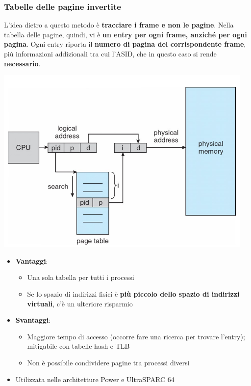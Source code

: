 \documentclass[12pt]{article}
\begin{document}
\subsubsection{Tabelle delle pagine invertite}
L'idea dietro a questo metodo è \textbf{tracciare i frame e non le pagine}. Nella tabella delle pagine, quindi, vi è \textbf{un entry per ogni frame, anziché per ogni pagina}.
Ogni entry riporta il \textbf{numero di pagina del corrispondente frame}, più informazioni addizionali tra cui l'ASID, che in questo caso si rende \textbf{necessario}.
\begin{center}
    \includegraphics[width = 0.70\linewidth]{Images/65.png}
\end{center}
\begin{itemize}
    \item \textbf{Vantaggi}:
    \begin{itemize}
        \item Una sola tabella per tutti i processi
        \item Se lo spazio di indirizzi fisici è \textbf{più piccolo dello spazio di indirizzi virtuali}, c'è un ulteriore risparmio
    \end{itemize}
    \item \textbf{Svantaggi}:
    \begin{itemize}
        \item Maggiore tempo di accesso (occorre fare una ricerca per trovare l'entry); mitigabile con tabelle hash e TLB
        \item Non è possibile condividere pagine tra processi diversi
    \end{itemize}
    \item Utilizzata nelle architetture Power e UltraSPARC 64
\end{itemize}
\end{document}
